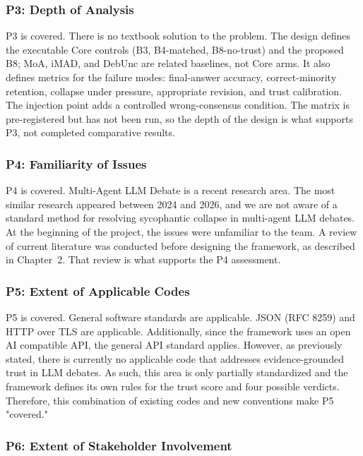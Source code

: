 \subsubsection{P3: Depth of Analysis}

P3 is covered. There is no textbook solution to the problem. The design defines the executable Core controls (B3, B4-matched, B8-no-trust) and the proposed B8; MoA, iMAD, and DebUnc are related baselines, not Core arms. It also defines metrics for the failure modes: final-answer accuracy, correct-minority retention, collapse under pressure, appropriate revision, and trust calibration. The injection point adds a controlled wrong-consensus condition. The matrix is pre-registered but has not been run, so the depth of the design is what supports P3, not completed comparative results.

\subsubsection{P4: Familiarity of Issues}

P4 is covered. Multi-Agent LLM Debate is a recent research area. The most similar research appeared between 2024 and 2026, and we are not aware of a standard method for resolving sycophantic collapse in multi-agent LLM debates. At the beginning of the project, the issues were unfamiliar to the team. A review of current literature was conducted before designing the framework, as described in Chapter~2. That review is what supports the P4 assessment.

\subsubsection{P5: Extent of Applicable Codes}

P5 is covered. General software standards are applicable. JSON (RFC 8259) and HTTP over TLS are applicable. Additionally, since the framework uses an open AI compatible API, the general API standard applies. However, as previously stated, there is currently no applicable code that addresses evidence-grounded trust in LLM debates. As such, this area is only partially standardized and the framework defines its own rules for the trust score and four possible verdicts. Therefore, this combination of existing codes and new conventions make P5 "covered."

\subsubsection{P6: Extent of Stakeholder Involvement}

